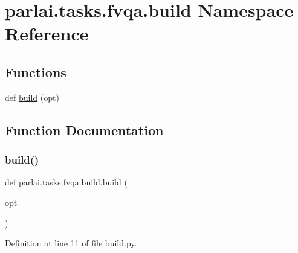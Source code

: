 \hypertarget{namespaceparlai_1_1tasks_1_1fvqa_1_1build}{}\section{parlai.\+tasks.\+fvqa.\+build Namespace Reference}
\label{namespaceparlai_1_1tasks_1_1fvqa_1_1build}
\subsection*{Functions}
\begin{DoxyCompactItemize}
\item 
def \hyperlink{namespaceparlai_1_1tasks_1_1fvqa_1_1build_a3a2e24cb615d980f27a566616af6292c}{build} (opt)
\end{DoxyCompactItemize}


\subsection{Function Documentation}
\mbox{\label{namespaceparlai_1_1tasks_1_1fvqa_1_1build_a3a2e24cb615d980f27a566616af6292c}} 
\subsubsection{\texorpdfstring{build()}{build()}}
{\footnotesize\ttfamily def parlai.\+tasks.\+fvqa.\+build.\+build (\begin{DoxyParamCaption}\item[{}]{opt }\end{DoxyParamCaption})}



Definition at line 11 of file build.\+py.

